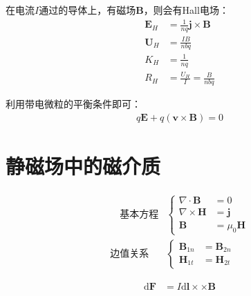 \documentclass[12pt,onecolumn,a4paper]{book}
\newenvironment{block}[1]{
    \begin{tcolorbox}[colback=blue!5!white,colframe=blue!75!black,title=#1]
}{
    \end{tcolorbox}
}
\numberwithin{table}{subsection}
\numberwithin{equation}{subsection}
\begin{document}
在电流$I$通过的导体上，有磁场$\mathbf{B}$，则会有Hall电场：
\begin{align}
    \mathbf{E}_H & = \frac{1}{nq} \mathbf{j} \times \mathbf{B} \\
    \mathbf{U}_H & = \frac{IB}{nbq}                            \\
    K_H          & = \frac{1}{nq}                              \\
    R_H          & = \frac{U_H}{I} =  \frac{B}{nbq}
\end{align}

利用带电微粒的平衡条件即可：
\begin{align}
    q\mathbf{E} + q(\mathbf{v} \times \mathbf{B}) = 0
\end{align}

\chapter{静磁场中的磁介质}

\begin{block}{方程}
    \begin{align}
        \quad
        \text{基本方程} & \left\{
        \begin{aligned}
            \nabla \cdot \mathbf{B}  & = 0                \\
            \nabla \times \mathbf{H} & = \mathbf{j}       \\
            \mathbf{B}               & = \mu_0 \mathbf{H}
        \end{aligned}
        \right.               \\
        \text{边值关系} \quad
                    & \left\{
        \begin{aligned}
            \mathbf{B}_{1n} & = \mathbf{B}_{2n} \\
            \mathbf{H}_{1t} & = \mathbf{H}_{2t}
        \end{aligned}
        \right.
    \end{align}
\end{block}

\begin{block}{Ampere 力}
    \begin{align}
        \mathrm{d} \mathbf{F} & = I \mathrm{d} \mathbf{l} \times  \times \mathbf{B}
    \end{align}
\end{block}
\end{document}
